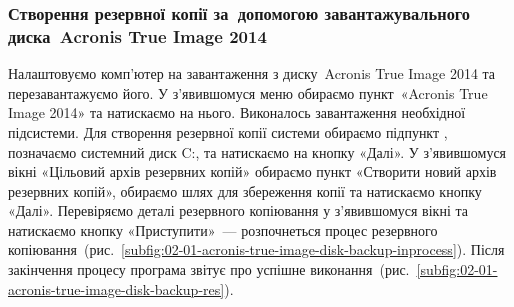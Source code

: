 \documentclass[
	a4paper,
	oneside,
	BCOR = 10mm,
	DIV = 12,
	12pt,
	headings = normal,
]{scrartcl}
\begin{document}
			\subsubsection{Створення резервної копії за~допомогою завантажувального диска~\textenglish{Acronis True Image 2014}}
			\label{ssec:acronis-true-image-2014-backup}
				Налаштовуємо комп'ютер на завантаження з диску~\textenglish{Acronis True Image 2014} та перезавантажуємо його. У з'явившомуся меню обираємо пункт~\textenglish{«Acronis True Image 2014»} та натискаємо на нього. Виконалось завантаження необхідної підсистеми. Для створення резервної копії системи обираємо підпункт , позначаємо системний диск \textenglish{C:}, та натискаємо на кнопку «Далі». У з'явившомуся вікні «Цільовий архів резервних копій» обираємо пункт «Створити новий архів резервних копій», обираємо шлях для збереження копії та натискаємо кнопку «Далі». Перевіряємо деталі резервного копіювання у з'явившомуся вікні та натискаємо кнопку «Приступити»~— розпочнеться процес резервного копіювання~(рис.~\ref{subfig:02-01-acronis-true-image-disk-backup-inprocess}). Після закінчення процесу програма звітує про успішне виконання~(рис.~\ref{subfig:02-01-acronis-true-image-disk-backup-res}).
\end{document}
